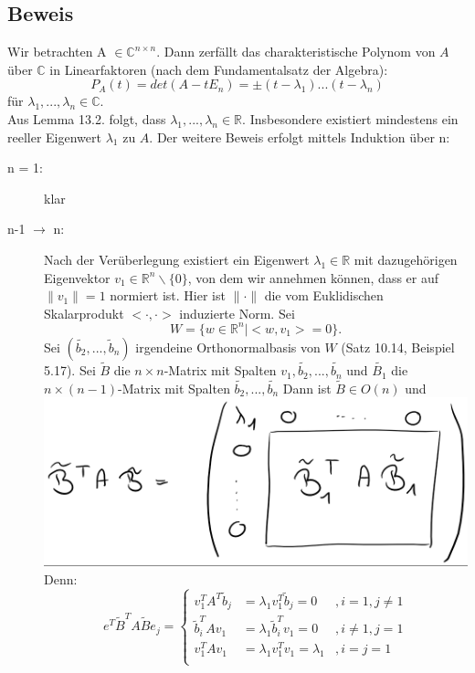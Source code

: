 \documentclass{scrbook}
\begin{document}
\subsection*{Beweis}
 Wir betrachten A $\in\mathbb{C}^{n \times n}$. Dann zerfällt das charakteristische Polynom von $A$ über $\mathbb{C}$ in Linearfaktoren (nach dem Fundamentalsatz der Algebra):
\[P_A(t) = det(A-tE_n) = \pm (t- \lambda_1) ... (t-\lambda_n)\]
für $\lambda_1,..., \lambda_n \in \mathbb{C}.$\\
Aus Lemma 13.2. folgt, dass $\lambda_1,..., \lambda_n \in \mathbb{R}.$ Insbesondere existiert mindestens ein reeller Eigenwert $\lambda_1$ zu $A$. Der weitere Beweis erfolgt mittels Induktion über n:
\begin{description}
\item[n = 1:] klar
\item[n-1 $\rightarrow$ n:] Nach der Verüberlegung existiert ein Eigenwert $\lambda_1 \in \mathbb{R}$ mit dazugehörigen Eigenvektor $v_1 \in \mathbb{R}^n\backslash \{0\}$, von dem wir annehmen können, dass er auf $\|v_1\|=1$ normiert ist. Hier ist $\|\cdot\|$ die vom Euklidischen Skalarprodukt $<\cdot,\cdot>$ induzierte Norm. Sei
\[W = \{w \in \mathbb{R}^n | <w,v_1> = 0\}.\]
Sei $(\tilde{b_2},...,\tilde{b}_n)$ irgendeine Orthonormalbasis von $W$ (Satz 10.14, Beispiel 5.17). Sei $\tilde{B}$ die $n \times n$-Matrix mit Spalten $v_1, \tilde{b_2},...,\tilde{b_n}$ und $\tilde{B_1}$ die $n \times (n-1)$-Matrix mit Spalten $\tilde{b_2},...,\tilde{b_n}$
Dann ist $\tilde{B} \in O(n)$ und \\
\includegraphics{Beweis_13_3_1.png}\\
Denn: \\
\[
e^T \tilde{B}^TA\tilde{B}e_j = \left\{
\begin{array}{lll}
v_1^TA^T\tilde{b}_j & = \lambda_1 v_1^T \tilde{b}_j = 0& , i=1, j\neq 1\\
\tilde{b}_i^T A v_1 & = \lambda_1 \tilde{b}^T_iv_1 = 0 &, i\neq1, j=1\\
v_1^TAv_1 & = \lambda_1 v_1^Tv_1 = \lambda_1 &,i=j=1\\

\end{array}\]
\end{description}
\end{document}
